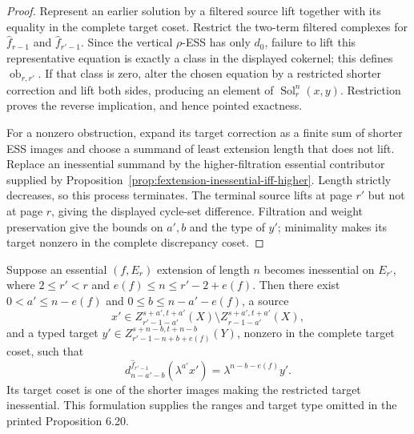 \begin{proof}
  Represent an earlier solution by a filtered source lift together with its
  equality in the complete target coset.  Restrict the two-term filtered
  complexes for $\widehat f_{r-1}$ and $\widehat f_{r'-1}$.  Since the vertical
  $\rho$-ESS has only $d_0$, failure to lift this representative equation is
  exactly a class in the displayed cokernel; this defines
  $\operatorname{ob}_{r,r'}$.
  If that class is zero, alter the chosen equation by a restricted shorter
  correction and lift both sides, producing an element of
  $\operatorname{Sol}_{r}^{n}(x,y)$.  Restriction proves the reverse
  implication, and hence pointed exactness.

  For a nonzero obstruction, expand its target correction as a finite sum of
  shorter ESS images and choose a summand of least extension length that does
  not lift.  Replace an inessential summand by the higher-filtration essential
  contributor supplied by
  Proposition~\ref{prop:fextension-inessential-iff-higher}.  Length strictly
  decreases, so this process terminates.  The terminal source lifts at page
  $r'$ but not at page $r$, giving the displayed cycle-set difference.
  Filtration and weight preservation give the bounds on $a',b$ and the type of
  $y'$; minimality makes its target nonzero in the complete discrepancy coset.
\end{proof}

\begin{proposition}
  \label{prop:page-extension-loss-certificate}
  \notready
  Suppose an essential $(f,E_r)$ extension of length $n$ becomes inessential
  on $E_{r'}$, where $2\le r'<r$ and
  $e(f)\le n\le r'-2+e(f)$.  Then there exist
  $0<a'\le n-e(f)$ and
  $0\le b\le n-a'-e(f)$, a source
  \[
    x'\in Z_{r'-1-a'}^{s+a',t+a'}(X)
      \setminus Z_{r-1-a'}^{s+a',t+a'}(X),
  \]
  and a typed target
  $y'\in Z_{r'-1-n+b+e(f)}^{s+n-b,t+n-b}(Y)$, nonzero in the complete target
  coset, such that
  \[
    d_{n-a'-b}^{\widehat f_{r'-1}}(\lambda^{a'}x')
       =\lambda^{n-b-e(f)}y'.
  \]
  Its target coset is one of the shorter images making the restricted target
  inessential.  This formulation supplies the ranges and target type omitted
  in the printed Proposition 6.20.
\end{proposition}

